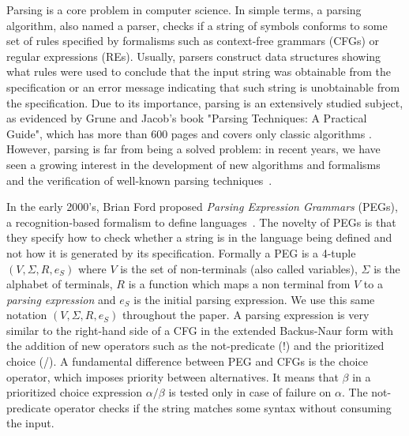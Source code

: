 \documentclass[preprint,12pt]{elsarticle}
\theoremstyle{definition}
\begin{document}
Parsing is a core problem in computer science. In simple terms, a parsing
algorithm, also named a parser, checks if a string of symbols conforms to some
set of rules specified by formalisms such as context-free grammars (CFGs) or
regular expressions (REs). Usually, parsers construct data structures showing
what rules were used to conclude that the input string was obtainable from the
specification or an error message indicating that such string is unobtainable
from the specification. Due to its importance, parsing is an extensively studied
subject, as evidenced by Grune and Jacob's book "Parsing Techniques: A Practical
Guide", which has more than 600 pages and covers only classic algorithms \cite{Grune90}.
However, parsing is far from being a solved problem: in recent years,
we have seen a growing interest in the development of new algorithms and
formalisms~\cite{Ford2004, Trevor10,Asperti10, Lucks17, Zhang23} and the verification
of well-known parsing techniques~\cite{FirsovU14, FirsovU13,LopesRC16,Bernardy16,JourdanPL12}.

In the early 2000's, Brian Ford proposed \emph{Parsing Expression Grammars}
(PEGs),  a recognition-based formalism to
define languages~\cite{Ford2004}. The novelty of PEGs is that they
specify how to check whether a string is in
the language being defined and not how it is generated by its specification.
Formally a PEG is a 4-tuple $(V, \Sigma, R, e_S)$ where $V$ is the set of
non-terminals (also called variables), $\Sigma$ is the alphabet of terminals,
$R$ is a function which maps a non terminal from $V$ to a {\it parsing expression}
and $e_S$ is the initial parsing
expression. We use this same notation $(V, \Sigma, R, e_S)$ throughout the paper. A parsing expression is very
similar to the right-hand side of a CFG in the extended Backus-Naur
form with the addition of new operators such as the not-predicate (!) and
the prioritized choice (/). A fundamental difference between PEG
and CFGs is the choice operator, which imposes priority between alternatives.
It means that $\beta$ in a prioritized choice expression $\alpha / \beta$ is tested only
in case of failure on $\alpha$. The not-predicate operator checks
if the string matches some syntax without consuming the input.
\end{document}
